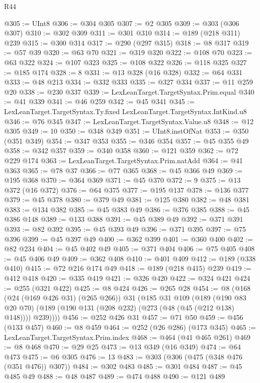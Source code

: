 \begin{lexlean}{R44}
\begin{coremodule}
@305 := UInt8
@306 := @304 @305
@307 := @2 @305
@309 := @303 (@306 @307)
@310 := @302 @309
@311 := @301 @310
@314 := @189 (@218 @311) @239
@315 := @300 @314
@317 := @290 (@297 @315)
@318 := @8 @317
@319 := @57 @39
@320 := @63 @70
@321 := @319 @320
@322 := @108 @70
@323 := @63 @322
@324 := @107 @323
@325 := @108 @322
@326 := @118 @325
@327 := @185 @174
@328 := 8
@331 := @13 @328 (@16 @328)
@332 := @64 @331
@333 := @48 @213
@334 := @332 @333
@335 := @327 @334
@337 := @11 @259 @20
@338 := @230 @337
@339 := LexLeanTarget.TargetSyntax.Prim.equal
@340 := @41 @339
@341 := @46 @259
@342 := @45 @341
@345 := LexLeanTarget.TargetSyntax.Ty.fixed LexLeanTarget.TargetSyntax.IntKind.u8
@346 := @76 @345
@347 := LexLeanTarget.TargetSyntax.Value.u8
@348 := @12 @305
@349 := 10
@350 := @348 @349
@351 := UInt8.instOfNat
@353 := @350 (@351 @349)
@354 := @347 @353
@355 := @346 @354
@357 := @45 @355 @49
@358 := @342 @357
@359 := @340 @358
@360 := @121 @359
@362 := @72 @229 @174
@363 := LexLeanTarget.TargetSyntax.Prim.natAdd
@364 := @41 @363
@365 := @78 @37
@366 := @77 @365
@368 := @45 @366 @49
@369 := @195 @368
@370 := @364 @369
@371 := @45 @370
@372 := 9
@375 := @13 @372 (@16 @372)
@376 := @64 @375
@377 := @195 @137
@378 := @136 @377
@379 := @45 @378
@380 := @379 @49
@381 := @125 @380
@382 := @48 @381
@383 := @134 @382
@385 := @45 @383 @49
@386 := @376 @385
@388 := @45 @386 @148
@389 := @133 @388
@391 := @45 @389 @49
@392 := @371 @391
@393 := @82 @392
@395 := @45 @393 @49
@396 := @371 @395
@397 := @75 @396
@399 := @45 @397 @49
@400 := @362 @399
@401 := @360 @400
@402 := @82 @234
@404 := @45 @402 @49
@405 := @371 @404
@406 := @75 @405
@408 := @45 @406 @49
@409 := @362 @408
@410 := @401 @409
@412 := @189 (@338 @410)
@415 := @72 @216 @174 @49
@418 := @189 (@218 @415) @239
@419 := @412 @418
@420 := @335 @419
@421 := @326 @420
@422 := @324 @421
@424 := @255 (@321 @422)
@425 := @8 @424
@426 := @265 @28
@454 := @8
    (@168
      (@24 (@169 @426 @31) (@265 @266))
      @31
      (@185
        @31
        @109
        (@189
          (@190 @83 @20 @70)
          (@189 (@190 @131 (@208 @232) (@273 (@48 (@45 (@212 @138) @148)))) @239))))
@456 := @252 @426 @31
@457 := @71 @50
@459 := @456 (@133 @457)
@460 := @8 @459
@464 := @252 (@26 @286) (@173 @345)
@465 := LexLeanTarget.TargetSyntax.Prim.index
@468 := @464 (@41 @465 @261)
@469 := @8 @468
@470 := @29 @25
@473 := @13 @349 (@16 @349)
@474 := @64 @473
@475 := @6 @305
@476 := 13
@483 := @303 (@306 (@475 (@348 @476 (@351 @476)) @307))
@484 := @302 @483
@485 := @301 @484
@487 := @45 @485 @49
@488 := @48 @487
@489 := @474 @488
@490 := @121 @489

\end{coremodule}
\end{lexlean}
